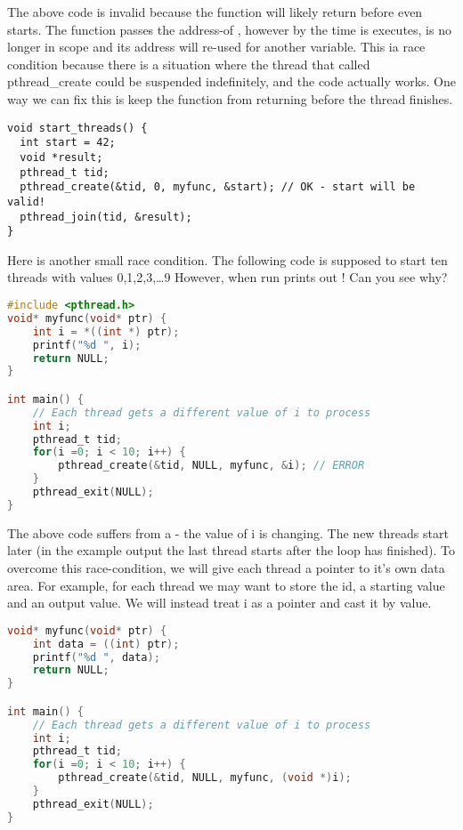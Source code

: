 The above code is invalid because the function  will likely return before  even starts. The function passes the address-of , however by the time  is executes,  is no longer in scope and its address will re-used for another variable. This ia race condition because there is a situation where the thread that called pthread\_create could be suspended indefinitely, and the code actually works. One way we can fix this is keep the function from returning before the thread finishes.

\begin{lstlisting}
void start_threads() {
  int start = 42;
  void *result;
  pthread_t tid;
  pthread_create(&tid, 0, myfunc, &start); // OK - start will be valid!
  pthread_join(tid, &result);
}
\end{lstlisting}

Here is another small race condition. The following code is supposed to start ten threads with values 0,1,2,3,\ldots{}9 However, when run prints out ! Can you see why?

\begin{lstlisting}[language=C]
#include <pthread.h>
void* myfunc(void* ptr) {
    int i = *((int *) ptr);
    printf("%d ", i);
    return NULL;
}

int main() {
    // Each thread gets a different value of i to process
    int i;
    pthread_t tid;
    for(i =0; i < 10; i++) {
        pthread_create(&tid, NULL, myfunc, &i); // ERROR
    }
    pthread_exit(NULL);
}
\end{lstlisting}

The above code suffers from a  - the value of i is changing. The new threads start later (in the example output the last thread starts after the loop has finished). To overcome this race-condition, we will give each thread a pointer to it's own data area. For example, for each thread we may want to store the id, a starting value and an output value. We will instead treat i as a pointer and cast it by value.

\begin{lstlisting}[language=C]
void* myfunc(void* ptr) {
    int data = ((int) ptr);
    printf("%d ", data);
    return NULL;
}

int main() {
    // Each thread gets a different value of i to process
    int i;
    pthread_t tid;
    for(i =0; i < 10; i++) {
        pthread_create(&tid, NULL, myfunc, (void *)i);
    }
    pthread_exit(NULL);
}
\end{lstlisting}

